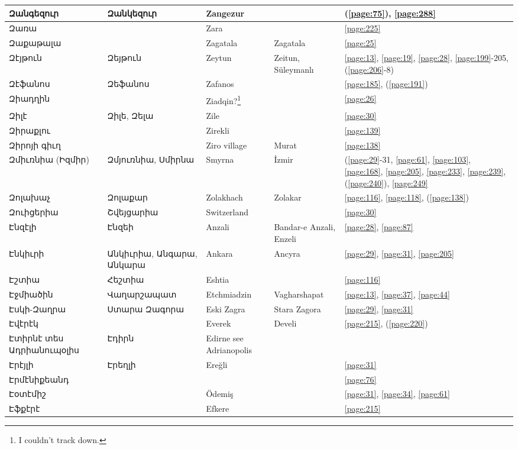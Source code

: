 \begin{center}
\begin{longtable}{|p{}|p{3cm}|p{3cm}|p{2cm}|p{3cm}|}
Զանգեզուր& Զանկեզուր&Zangezur & &(\ref{page:75}), \ref{page:288}\\ \hline
Զառա& &Zara & &\ref{page:225}\\ \hline
Զաքաթալա& & Zagatala &Zagatala &\ref{page:25}\\ \hline
Զէյթուն&Զեյթուն &Zeytun &Zeitun, Süleymanlı &\ref{page:13}, \ref{page:19}, \ref{page:28}, \ref{page:199}-205, (\ref{page:206}-8)\\ \hline
Զէֆանոս& Զեֆանոս&Zafanos & &\ref{page:185}, (\ref{page:191})\\ \hline
Զիադղին& &Ziadqin?\footnote{I couldn't track down.} & &\ref{page:26}\\ \hline
Զիլէ& Զիլե,   Զելա & Zile& &\ref{page:30}\\ \hline
Զիրաքլու& &Zirekli & &\ref{page:139}\\ \hline
Զիրոյի գիւղ& &Ziro village &Murat &\ref{page:138}\\ \hline
Զմիւռնիա (Իզմիր)&Զմյուռնիա, Սմիրնա  &Smyrna    &İzmir &(\ref{page:29}-31, \ref{page:61}, \ref{page:103}, \ref{page:168}, \ref{page:205}, \ref{page:233}, \ref{page:239}, (\ref{page:240}), \ref{page:249}\\ \hline
Զոլախաչ& Զոլաքար&Zolakhach & Zolakar&\ref{page:116}, \ref{page:118}, (\ref{page:138})\\ \hline
Զուիցերիա& Շվեյցարիա&Switzerland & &\ref{page:30}\\ \hline
Էնզէլի&Էնզեի & Anzali& Bandar-e Anzali, Enzeli&\ref{page:28}, \ref{page:87}\\ \hline
Էնկիւրի&Անկիւրիա, Անգարա, Անկարա &   Ankara&Ancyra &\ref{page:29}, \ref{page:31}, \ref{page:205}\\ \hline
Էշտիա&   Հեշտիա & Eshtia& &\ref{page:116}\\ \hline
Էջմիածին&Վաղարշապատ &Etchmiadzin & Vagharshapat&\ref{page:13}, \ref{page:37}, \ref{page:44}\\ \hline
Էսկի-Զաղրա& Ստարա Զագորա& Eski Zagra&Stara Zagora &\ref{page:29}, \ref{page:31}\\ \hline
Էվէրէկ& &Everek &Develi &\ref{page:215}, (\ref{page:220})\\ \hline
Էտիրնէ տես Ադրիանուպօլիս&Էդիրն &Edirne see Adrianopolis & &\\ \hline
Էրէյլի&Էրեղլի & Ereğli& &\ref{page:31}\\ \hline
Էրմէնիքեանդ& & & &\ref{page:76}\\ \hline
Էօտէմիշ& & Ödemiş& &\ref{page:31}, \ref{page:34}, \ref{page:61}\\ \hline
Էֆքէրէ& &Efkere & &\ref{page:215}\\ \hline

\end{longtable}
\end{center}
